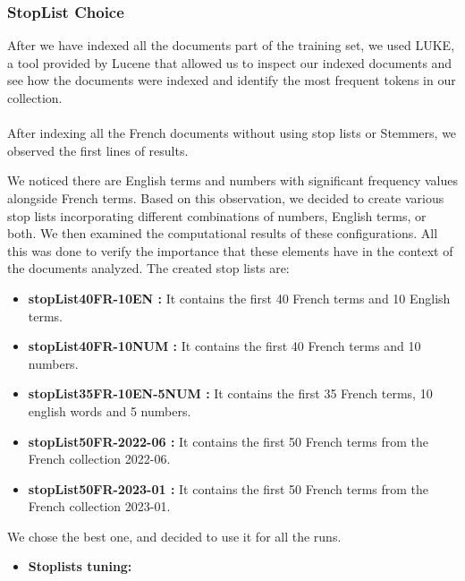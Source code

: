 \subsubsection{StopList Choice}
After we have indexed all the documents part of the training set, we used LUKE, a tool provided by Lucene that allowed us to inspect our indexed documents and see how the documents were indexed and identify the most frequent tokens in our collection.
\\ \\
After indexing all the French documents without using stop lists or Stemmers, we observed the first lines of results.

\begin{flushleft}
    We noticed there are English terms and numbers with significant frequency values alongside French terms. Based on this observation, we decided to create various stop lists incorporating different combinations of numbers, English terms, or both. We then examined the computational results of these configurations. All this was done to verify the importance that these elements have in the context of the documents analyzed.
\newline
    The created stop lists are:
    \begin{itemize}
        
        \item \textbf{stopList40FR-10EN :} It contains the first 40 French terms and 10 English terms.

        \item \textbf{stopList40FR-10NUM :} It contains the first 40 French terms and 10 numbers.

        \item \textbf{stopList35FR-10EN-5NUM :} It contains the first 35 French terms, 10 english words and 5 numbers.

        \item \textbf{stopList50FR-2022-06 :} It contains the first 50 French terms from the French collection 2022-06.
        
        \item \textbf{stopList50FR-2023-01 :} It contains the first 50 French terms from the French collection 2023-01.
    \end{itemize}
\end{flushleft}

We chose the best one, and decided to use it for all the runs.
\begin{itemize}
    \item  \textbf{Stoplists tuning:}
\end{itemize}

